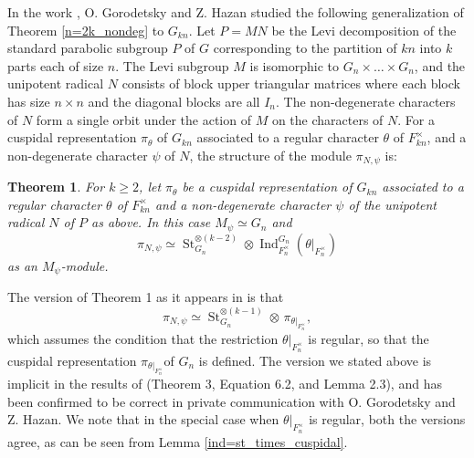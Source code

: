 \documentclass[reqno]{amsart}
\newtheorem{theorem}{Theorem}[section]
\theoremstyle{definition}
\theoremstyle{remark}
\numberwithin{equation}{section}
\DeclareMathOperator{\Ind}{Ind}
\DeclareMathOperator{\St}{St}
\begin{document}
In the work \cite{HazGor},  O. Gorodetsky and Z. Hazan studied the following generalization of Theorem \ref{n=2k_nondeg} to $G_{kn}$. Let $P=MN$ be the Levi decomposition of the standard  parabolic subgroup $P$ of $G$ corresponding to the partition of $kn$ into $k$ parts each of size $n$. The Levi subgroup $M$ is isomorphic to $G_n\times \dots \times G_n$, and the unipotent radical $N$ consists of block upper triangular matrices where each block has size $n \times n$ and the diagonal blocks are all $I_n$. The non-degenerate characters of $N$ form a single orbit under the action of $M$ on the characters of $N$. For a cuspidal representation $\pi_\theta$ of $G_{kn}$ associated to a regular character $\theta$ of $F_{kn}^\times$, and  a non-degenerate character $\psi$ of $N$, the structure of the module $\pi_{N,\psi}$ is:
\begin{theorem} \cite[Theorem 
 1]{HazGor} For $k \geq 2$, 
let $\pi_\theta$ be 
  a cuspidal representation  of $G_{kn}$ associated to a regular character $\theta$ of $F_{kn}^\times$ and a non-degenerate character $\psi$ of the unipotent radical $N$ of $P$ as above. 
  In this case $M_{\psi} \simeq G_n$ and 
\[\pi_{N,\psi} \simeq \St_{G_n}^{\otimes (k-2)} \otimes  \Ind_{F_n^\times}^{G_n} (\theta |_{F_n^\times}) \]
as an $M_{\psi}$-module. 
\end{theorem}%
The version of Theorem 1  as it appears in \cite{HazGor} is that 
\[ \pi_{N,\psi} \simeq \St_{G_n}^{\otimes (k-1)} \otimes  
 \, \pi_{\theta  |_{F_n^{\times}}},\]
which assumes the condition that the restriction $\theta |_{F_n^\times}$ is regular, so that the cuspidal representation $\pi_{\theta  |_{F_n^\times}}$of $G_n$ is defined. The version we stated above is implicit in the results of \cite{HazGor} (Theorem 3, Equation 6.2, and Lemma 2.3), and has been confirmed to be correct  in private communication  with O. Gorodetsky and Z. Hazan. We note that in the special case when $\theta |_{F_n^\times}$ is regular, both the  versions agree, as can be seen  from Lemma \ref{ind=st_times_cuspidal}.


\end{document}
